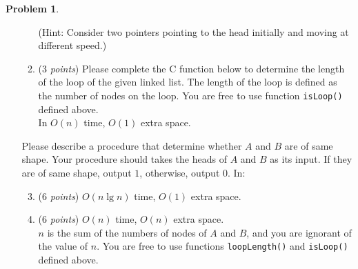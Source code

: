 \documentclass[12pt,a4paper]{report}
\newcommand{\points}[1]{ ($#1$ \textit{points}) }
\theoremstyle{definition}
\newtheorem{problem}{\textbf{Problem}}
\newcommand\NoIndent[1]{
  \par\vbox{\parbox[t]{\linewidth}{#1}}
}
\newcommand{\solution}{\textbf{\NoIndent{Solution.}}}
\theoremstyle{definition}
\begin{document}
\begin{problem}
\begin{enumerate}[label=\arabic*.]
\begin{enumerate}[label=\alph*.]
        (Hint: Consider two pointers pointing to the head initially and moving at different speed.)

        \item \points{3}Please complete the C function below to determine the length of the loop of the given linked list. The length of the loop is defined as the number of nodes on the loop. You are free to use function \texttt{isLoop()} defined above.\\
        In $O(n)$ time, $O(1)$ extra space.

\end{enumerate}
        Please describe a procedure that determine whether $A$ and $B$ are of same shape. Your procedure should takes the heads of $A$ and $B$ as its input. If they are of same shape, output $1$, otherwise, output $0$. In:
\begin{enumerate}[label=\alph*.]
    \setcounter{enumii}{2}
        \item \points{6}$O(n \lg n)$ time, $O(1)$ extra space.
        \item \points{6}$O(n)$ time, $O(n)$ extra space.\\
    \noindent $n$ is the sum of the numbers of nodes of $A$ and $B$, and you are ignorant of the value of $n$. You are free to use functions \texttt{loopLength()} and \texttt{isLoop()} defined above.
\begin{framed}
\solution
    

\end{framed}
\end{enumerate}
\end{enumerate}
\end{problem}
\end{document}
